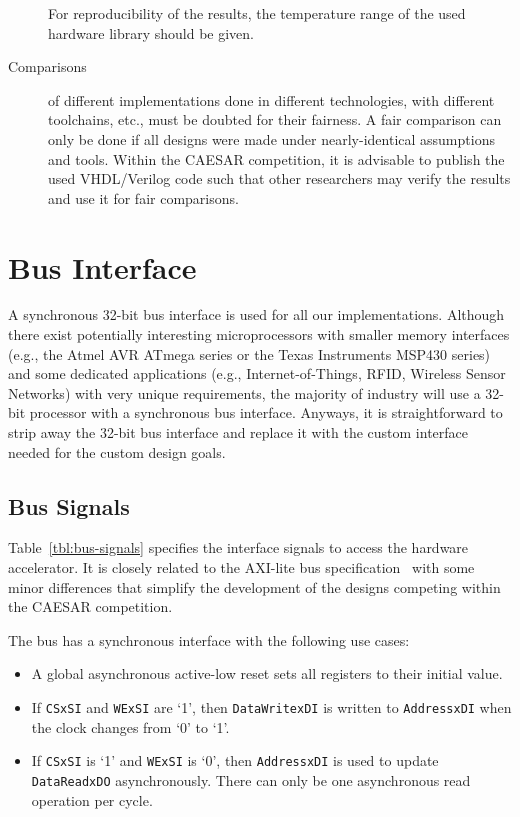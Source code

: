 \documentclass[runningheads]{llncs}
\begin{document}
\begin{description}
  For reproducibility of the results, the temperature range of the used hardware library should be given.
\item[Comparisons] of different implementations done in different technologies, with different toolchains, etc., must be doubted for their fairness. A fair comparison can only be done if all designs were made under nearly-identical assumptions and tools. Within the CAESAR competition, it is advisable to publish the used VHDL/Verilog code such that other researchers may verify the results and use it for fair comparisons. 
\end{description}

\section{Bus Interface}

A synchronous 32-bit bus interface is used for all our implementations. Although there exist potentially interesting microprocessors with smaller memory interfaces (e.g., the Atmel AVR ATmega series or the Texas Instruments MSP430 series) and some dedicated applications (e.g., Internet-of-Things, RFID, Wireless Sensor Networks) with very unique requirements, the majority of industry will use a 32-bit processor with a synchronous bus interface. Anyways, it is straightforward to strip away the 32-bit bus interface and replace it with the custom interface needed for the custom design goals. 

\subsection{Bus Signals}

Table~\ref{tbl:bus-signals} specifies the interface signals to access the hardware accelerator. It is closely related to the AXI-lite bus specification~\cite{} with some minor differences that simplify the development of the designs competing within the CAESAR competition.  

The bus has a synchronous interface with the following use cases:
\begin{itemize}
\item A global asynchronous active-low reset sets all registers to their initial value. 
\item If \texttt{CSxSI} and \texttt{WExSI} are `1', then \texttt{DataWritexDI} is written to \texttt{AddressxDI} when the clock changes from `0' to `1'.
\item If \texttt{CSxSI} is `1' and \texttt{WExSI} is `0', then \texttt{AddressxDI} is used to update \texttt{DataReadxDO} asynchronously.
  There can only be one asynchronous read operation per cycle.
\end{itemize}
\end{document}
